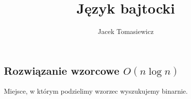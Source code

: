 \documentclass[opr,utf8]{sinol}
\title{Język bajtocki}
\author{Jacek Tomasiewicz}
\begin{document}
  \begin{tasktext}%
   
\section{Rozwiązanie wzorcowe $O(n \log n)$}

Miejsce, w którym podzielimy wzorzec wyszukujemy binarnie.
      
  \end{tasktext}
\end{document}
